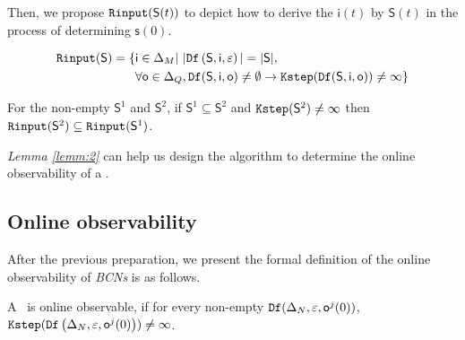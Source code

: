 Then, we propose ${\tt Rinput}(\mathsf{S}(t))$ to depict how to derive the $\mathsf{i}(t)$ by $\mathsf{S}(t)$ in the process of determining $\mathsf{s}(0)$.

\begin{definition}[$\Ri(\mathsf{S})$] 
\begin{equation*}
\begin{split}
{\tt Rinput}(\mathsf{S})=\{&\mathsf{i}\in \Delta_M|\  |{\tt Df}\left(\mathsf{S},\mathsf{i},\varepsilon\right)|=|\mathsf{S}|, \\
& \forall \mathsf{o} \in \Delta_Q, {\tt Df}(\mathsf{S},\mathsf{i},\mathsf{o})\ne \emptyset \rightarrow {\tt Kstep}({\tt Df}(\mathsf{S},\mathsf{i},\mathsf{o}))\ne \infty\}
\end{split}
\end{equation*}
\end{definition}
\begin{lemma}
For the non-empty $\mathsf{S}^{1}$ and $\mathsf{S}^{2}$, if $\mathsf{S}^{1}\subseteq\mathsf{S}^{2}$ and ${\tt Kstep}(\mathsf{S}^{2})\ne\infty$ then ${\tt Rinput}(\mathsf{S}^2)\subseteq{\tt Rinput}(\mathsf{S}^1)$.
\label{lemm:2}
\end{lemma}

{\em Lemma \ref{lemm:2}} can help us design the algorithm to determine the online observability of a \BCN.%

\subsection{Online observability}
After the previous preparation, we present the formal definition of the online observability of {\em BCNs} is as follows.

\begin{definition}
 A \BCN\ is online observable,
if for every non-empty ${\tt Df}(\Delta_N,\varepsilon, \mathsf{o}^{j}(0))$, ${\tt Kstep}({\tt Df}\left(\Delta_N,\varepsilon,\mathsf{o}^{j}(0)\right))\ne\infty$.
\end{definition}


